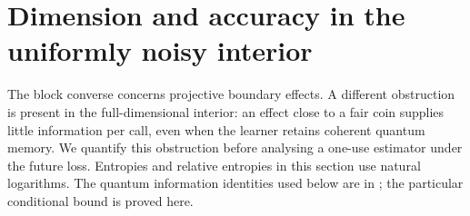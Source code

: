 \section{Dimension and accuracy in the uniformly noisy interior}
\label{sec:dimensionlearning78}

The block converse concerns projective boundary effects.  A different
obstruction is present in the full-dimensional interior: an effect
close to a fair coin supplies little information per call, even
when the learner retains coherent quantum memory.  We quantify this
obstruction before analysing a one-use estimator under the future
loss.  Entropies and relative entropies in this section use natural
logarithms.  The quantum information identities used below are in
\cite{Watrous65}; the particular conditional bound is proved here.

